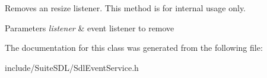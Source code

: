 Removes an resize listener. This method is for internal usage only.


\begin{DoxyParams}{Parameters}
{\em listener} & event listener to remove \\
\hline
\end{DoxyParams}


The documentation for this class was generated from the following file\+:\begin{DoxyCompactItemize}
\item 
include/\+Suite\+S\+D\+L/Sdl\+Event\+Service.\+h\end{DoxyCompactItemize}
